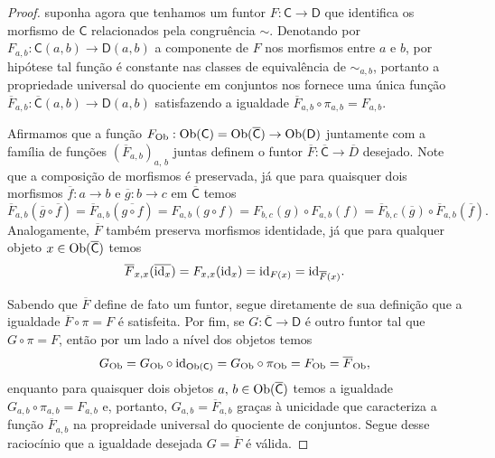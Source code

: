 \begin{proof}
    suponha agora que tenhamos um funtor $F: \mathsf{C} \to \mathsf{D}$ que identifica os morfismo de $\mathsf{C}$ relacionados pela congruência $\sim$.
    Denotando por $F_{a,b}: \mathsf{C}(a,b) \to \mathsf{D}(a,b)$ a componente de $F$ nos morfismos entre $a$ e $b$, por hipótese tal função é constante nas classes de equivalência de $\sim_{a,b}$, portanto a propriedade universal do quociente em conjuntos nos fornece uma única função $\overline{F}_{a,b}: \overline{\mathsf{C}}(a,b) \to \mathsf{D}(a,b)$ satisfazendo a igualdade $\overline{F}_{a,b} \circ \pi_{a,b} = F_{a,b}$.

    Afirmamos que a função $F_{\mathrm{Ob}}: \mathrm{Ob}(\mathsf{C}) = \mathrm{Ob}(\overline{\mathsf{C}}) \to \mathrm{Ob}(\mathsf{D})$ juntamente com a família de funções $(\overline{F}_{a,b})_{a,\,b}$ juntas definem o funtor $\overline{F}: \overline{\mathsf{C}} \to \overline{D}$ desejado.
    Note que a composição de morfismos é preservada, já que para quaisquer dois morfismos $\overline{f}: a \to b$ e $\overline{g}: b \to c$ em $\overline{\mathsf{C}}$ temos
    \begin{displaymath}
        \overline{F}_{a,b}(\overline{g} \circ \overline{f})
        = \overline{F}_{a,b}(\overline{g \circ f})
        = F_{a,b}(g \circ f)
        = F_{b,c}(g) \circ F_{a,b}(f)
        = \overline{F}_{b,c}(\overline{g}) \circ \overline{F}_{a,b}(\overline{f}).
    \end{displaymath}
    Analogamente, $\overline{F}$ também preserva morfismos identidade, já que para qualquer objeto $x \in \mathrm{Ob}(\overline{\mathsf{C}})$ temos
    \begin{displaymath}
        \overline{F}_{x,x}(\overline{\mathrm{id}_x})
        = F_{x,x}(\mathrm{id}_x)
        = \mathrm{id}_{F(x)}
        = \mathrm{id}_{\overline{F}(x)}.
    \end{displaymath}

    Sabendo que $\overline{F}$ define de fato um funtor, segue diretamente de sua definição que a igualdade $\overline{F} \circ \pi = F$ é satisfeita.
    Por fim, se $G: \overline{\mathsf{C}} \to \mathsf{D}$ é outro funtor tal que $G \circ \pi = F$, então por um lado a nível dos objetos temos
    \begin{displaymath}
        G_{\mathrm{Ob}} = G_{\mathrm{Ob}} \circ \mathrm{id}_{\mathrm{Ob}(\mathsf{C})}
        = G_{\mathrm{Ob}} \circ \pi_{\mathrm{Ob}}
        = F_{\mathrm{Ob}}
        = \overline{F}_{\mathrm{Ob}},
    \end{displaymath}
    enquanto para quaisquer dois objetos $a,\,b \in \mathrm{Ob}(\overline{\mathsf{C}})$ temos a igualdade $G_{a,b} \circ \pi_{a,b} = F_{a,b}$ e, portanto, $G_{a,b} = \overline{F}_{a,b}$ graças à unicidade que caracteriza a função $\overline{F}_{a,b}$ na propreidade universal do quociente de conjuntos.
    Segue desse raciocínio que a igualdade desejada $G = \overline{F}$ é válida.
\end{proof}